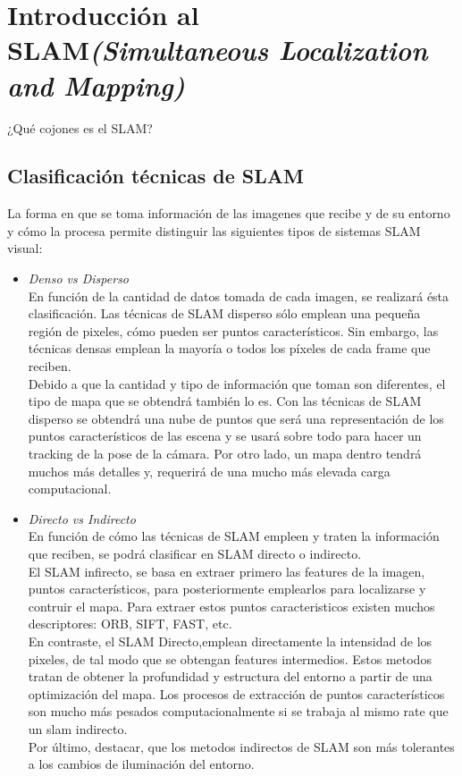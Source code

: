 \section{Introducción al SLAM\textit{(Simultaneous Localization and Mapping)}}
¿Qué cojones es el SLAM?

\subsection{Clasificación técnicas de SLAM}
La forma en que se toma información de las imagenes que recibe y de su entorno y cómo la procesa permite distinguir las siguientes tipos de sistemas
SLAM visual:
\begin{itemize}
    \item \textit{Denso vs Disperso} \\
    En función de la cantidad de datos tomada de cada imagen, se realizará ésta clasificación. Las técnicas de SLAM disperso sólo emplean una pequeña
    región de pixeles, cómo pueden ser puntos característicos. Sin embargo, las técnicas densas emplean la mayoría o todos los píxeles de cada frame
    que reciben. \\
    Debido a que la cantidad y tipo de información que toman son diferentes, el tipo de mapa que se obtendrá también lo es. Con las técnicas de SLAM
    disperso se obtendrá una nube de puntos que será una representación de los puntos característicos de las escena y se usará sobre todo para hacer
    un tracking de la pose de la cámara. Por otro lado, un mapa dentro tendrá muchos más detalles y, requerirá de una mucho más elevada carga computacional.

 \item \textit{Directo vs Indirecto} \\
En función de cómo las técnicas de SLAM empleen y traten la información que reciben, se podrá clasificar en SLAM directo o indirecto.\\
El SLAM infirecto, se basa en extraer primero las features de la imagen, puntos característicos, para posteriormente emplearlos para localizarse y contruir
el mapa. Para extraer estos puntos caracteristicos existen muchos descriptores: ORB, SIFT, FAST, etc. \\
En contraste, el SLAM Directo,emplean directamente la intensidad de los pixeles, de tal modo que se obtengan features intermedios. Estos metodos tratan de 
obtener la profundidad y estructura del entorno a partir de una optimización del mapa. Los procesos de extracción de puntos característicos son mucho más
pesados computacionalmente si se trabaja al mismo rate que un slam indirecto.\\
Por último, destacar, que los metodos indirectos de SLAM son más tolerantes a los cambios de iluminación del entorno.\\


\end{itemize}
